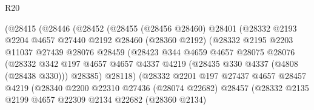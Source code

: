 \begin{lexlean}{R20}
\begin{coremodule}
                        (@28415
                          (@28446
                            (@28452
                              (@28455
                                (@28456 @28460)
                                @28401
                                (@28332
                                  @2193
                                  @2204
                                  @4657
                                  @27440
                                  @2192
                                  @28460
                                  (@28360 @2192)
                                  (@28332
                                    @2195
                                    @2203
                                    @11037
                                    @27439
                                    @28076
                                    @28459
                                    (@28423
                                      @344
                                      @4659
                                      @4657
                                      @28075
                                      @28076
                                      (@28332
                                        @342
                                        @197
                                        @4657
                                        @4657
                                        @4337
                                        @4219
                                        (@28435 @330 @4337 (@4808 (@28438 @330)))
                                        @28385)
                                      @28118)
                                    (@28332
                                      @2201
                                      @197
                                      @27437
                                      @4657
                                      @28457
                                      @4219
                                      (@28340
                                        @2200
                                        @22310
                                        @27436
                                        (@28074 @22682)
                                        @28457
                                        (@28332
                                          @2135
                                          @2199
                                          @4657
                                          @22309
                                          @2134
                                          @22682
                                          (@28360 @2134)

\end{coremodule}
\end{lexlean}
